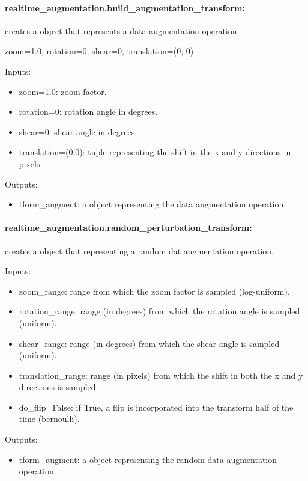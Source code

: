 \documentclass[a4paper,10pt]{article}
\begin{document}
\paragraph{realtime\_augmentation.build\_augmentation\_transform:} creates a  object that represents a data augmentation operation.

zoom=1.0, rotation=0, shear=0, translation=(0, 0)

Inputs:
 \begin{itemize}
  \item{zoom=1.0:} zoom factor.
  \item{rotation=0:} rotation angle in degrees.
  \item{shear=0:} shear angle in degrees.
  \item{translation=(0,0):} tuple representing the shift in the x and y directions in pixels.
 \end{itemize}
 
Outputs:
\begin{itemize}
 \item{tform\_augment:} a  object representing the data augmentation operation.
\end{itemize}

\paragraph{realtime\_augmentation.random\_perturbation\_transform:} creates a  object that representing a random dat augmentation operation.

Inputs:
 \begin{itemize}
  \item{zoom\_range:} range from which the zoom factor is sampled (log-uniform).
  \item{rotation\_range:} range (in degrees) from which the rotation angle is sampled (uniform).
  \item{shear\_range:} range (in degrees) from which the shear angle is sampled (uniform).
  \item{translation\_range:} range (in pixels) from which the shift in both the x and y directions is sampled.
  \item{do\_flip=False:} if True, a flip is incorporated into the transform half of the time (bernoulli).
 \end{itemize}
 
Outputs:
\begin{itemize}
 \item{tform\_augment:} a  object representing the random data augmentation operation.
\end{itemize}
\end{document}

